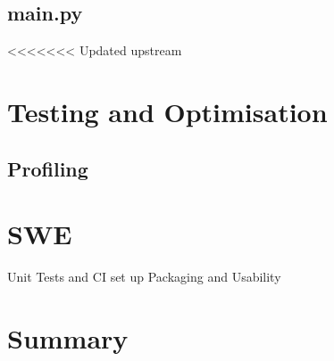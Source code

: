 \documentclass[11pt]{article}
\begin{document}
\begin{itemize}
\subsection{main.py}

<<<<<<< Updated upstream
\section {Testing and Optimisation}
\subsection {Profiling}

\section {SWE}
Unit Tests and CI set up
Packaging and Usability

\section {Summary}






\end{itemize}
\end{document}
